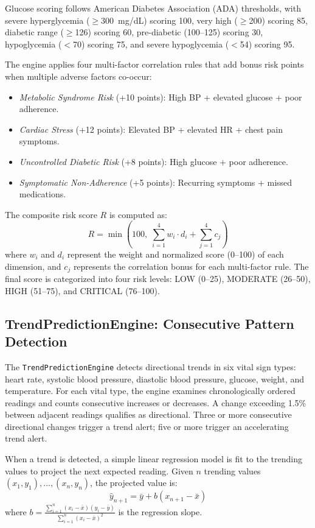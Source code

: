 \documentclass[journal,onecolumn,web]{ieeecolor}
\begin{document}
Glucose scoring follows American Diabetes Association
(ADA) thresholds, with severe hyperglycemia
($\geq$300~mg/dL) scoring 100, very high ($\geq$200)
scoring 85, diabetic range ($\geq$126) scoring 60,
pre-diabetic (100--125) scoring 30, hypoglycemia
($<$70) scoring 75, and severe hypoglycemia ($<$54)
scoring 95.

The engine applies four multi-factor correlation rules
that add bonus risk points when multiple adverse
factors co-occur:

\begin{itemize}
\item {\it Metabolic Syndrome Risk} (+10 points):
High BP + elevated glucose + poor adherence.
\item {\it Cardiac Stress} (+12 points):
Elevated BP + elevated HR + chest pain symptoms.
\item {\it Uncontrolled Diabetic Risk} (+8 points):
High glucose + poor adherence.
\item {\it Symptomatic Non-Adherence} (+5 points):
Recurring symptoms + missed medications.
\end{itemize}

The composite risk score $R$ is computed as:
\begin{equation}
R = \min\!\left(100,\; \sum_{i=1}^{4} w_i \cdot d_i
+ \sum_{j=1}^{4} c_j\right)
\label{eq:riskscore}
\end{equation}
where $w_i$ and $d_i$ represent the weight and
normalized score (0--100) of each dimension, and
$c_j$ represents the correlation bonus for each
multi-factor rule. The final score is categorized
into four risk levels: LOW (0--25), MODERATE (26--50),
HIGH (51--75), and CRITICAL (76--100).

\subsection{TrendPredictionEngine: Consecutive Pattern
Detection}
The {\tt TrendPredictionEngine} detects directional
trends in six vital sign types: heart rate, systolic
blood pressure, diastolic blood pressure, glucose,
weight, and temperature. For each vital type, the
engine examines chronologically ordered readings and
counts consecutive increases or decreases. A change
exceeding 1.5\% between adjacent readings qualifies
as directional. Three or more consecutive directional
changes trigger a trend alert; five or more trigger
an accelerating trend alert.

When a trend is detected, a simple linear regression
model is fit to the trending values to project the
next expected reading. Given $n$ trending values
$(x_1, y_1), \ldots, (x_n, y_n)$, the projected
value is:
\begin{equation}
\hat{y}_{n+1} = \bar{y} + b(x_{n+1} - \bar{x})
\label{eq:regression}
\end{equation}
where $b = \frac{\sum_{i=1}^{n}(x_i - \bar{x})
(y_i - \bar{y})}{\sum_{i=1}^{n}(x_i -
\bar{x})^2}$ is the regression slope.
\end{document}
